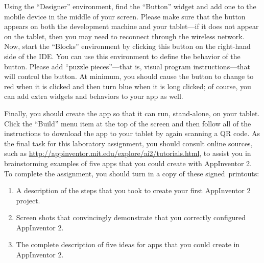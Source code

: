 Using the ``Designer'' environment, find the ``Button'' widget and add one to the mobile device in the middle of your
screen.  Please make sure that the button appears on both the development machine and your tablet---if it does not
appear on the tablet, then you may need to reconnect through the wireless network. Now, start the ``Blocks'' environment
by clicking this button on the right-hand side of the IDE. You can use this environment to define the behavior
of the button.  Please add ``puzzle pieces''---that is, visual program instructions---that will control the button. At
minimum, you should cause the button to change to red when it is clicked and then turn blue when it is long clicked; of
course, you can add extra widgets and behaviors to your app as well.

Finally, you should create the app so that it can run, stand-alone, on your tablet. Click the ``Build'' menu item at the
top of the screen and then follow all of the instructions to download the app to your tablet by again scanning a QR
code.  As the final task for this laboratory assignment, you should consult online sources, such as
\url{http://appinventor.mit.edu/explore/ai2/tutorials.html}, to assist you in brainstorming examples of five apps that
you could create with AppInventor 2. To complete the assignment, you should turn in a copy of these \mbox{signed
  printouts}: 



\vspace*{-.1in}

\begin{enumerate}
	\itemsep0em
	\item A description of the steps that you took  to create your first AppInventor 2 project.
	\item Screen shots that convincingly demonstrate that you correctly configured AppInventor 2.
	\item The complete description of five ideas for apps that you could create in AppInventor 2.
\end{enumerate}

